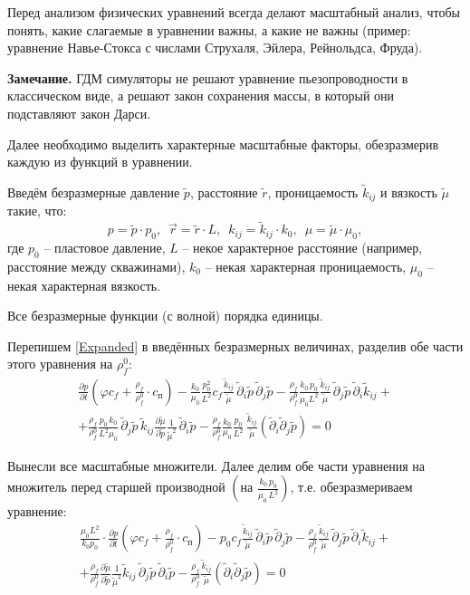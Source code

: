 \documentclass[a4paper,14pt]{extarticle}
\newcommand{\beq}{\begin{equation}}
\newcommand{\eeq}{\end{equation}}
\begin{document}
Перед анализом физических уравнений всегда делают масштабный анализ, чтобы понять, какие слагаемые в уравнении важны, а какие не важны (пример: уравнение Навье-Стокса с числами Струхаля, Эйлера, Рейнольдса, Фруда).

\textbf{Замечание.} ГДМ симуляторы не решают уравнение пьезопроводности в классическом виде, а решают закон сохранения массы, в который они подставляют закон Дарси.

Далее необходимо выделить характерные масштабные факторы, обезразмерив каждую из функций в уравнении.

Введём безразмерные давление $\tilde{p}$, расстояние $\tilde{r}$, проницаемость $\tilde{k}_{ij}$ и вязкость $\tilde{\mu}$ такие, что:
\beq
p=\tilde{p}\cdot p_0,\,\,\,\vec{r}=\tilde{r}\cdot L,\,\,\,k_{ij}=\tilde{k}_{ij}\cdot k_0,\,\,\,\mu=\tilde{\mu}\cdot\mu_0,
\eeq
где $p_0$ -- пластовое давление, $L$ -- некое характерное расстояние (например, расстояние между скважинами), $k_0$ -- некая характерная проницаемость, $\mu_0$ -- некая характерная вязкость.

Все безразмерные функции (с волной) порядка единицы.

Перепишем \eqref{Expanded} в введённых безразмерных величинах, разделив обе части этого уравнения на $\rho_f^0$:
\begin{multline}
\frac{\partial p}{\partial t}\left(\varphi c_{\!f}+\frac{\rho_{\!f}}{\rho_{\!f}^0}\cdot c_\text{п}\right)-\frac{k_0}{\mu_0}\frac{p_0^2}{L^2}c_{\!f}\frac{\tilde{k}_{ij}}{\tilde{\mu}}\,\tilde{\partial}_i\tilde{p}\,\tilde{\partial}_{\!j}\tilde{p}-\frac{\rho_{\!f}}{\rho_{\!f}^0}\frac{k_0\,p_0}{\mu_0L^2}\frac{\tilde{k}_{ij}}{\tilde{\mu}}\,\tilde{\partial}_{\!j}\tilde{p}\,\tilde{\partial}_i\tilde{k}_{ij}+\\+\frac{\rho_{\!f}}{\rho_{\!f}^0}\frac{p_0\,k_0}{L^2\mu_0}\,\tilde{\partial}_{\!j}\tilde{p}\,\tilde{k}_{ij}\frac{\partial\tilde{\mu}}{\partial\tilde{p}}\frac{1}{\tilde{\mu}^2}\,\tilde{\partial}_i\tilde{p}-\frac{\rho_{\!f}}{\rho_{\!f}^0}\frac{k_0}{\mu_0}\frac{p_0}{L^2}\,\frac{\tilde{k}_{ij}}{\tilde{\mu}}\left(\tilde{\partial}_i\tilde{\partial}_{\!j}\tilde{p}\right)=0
\end{multline}

Вынесли все масштабные множители. Далее делим обе части уравнения на множитель перед старшей производной $\left(\text{на }\frac{k_0\,p_0}{\mu_0\,L^2}\right)$, т.е. обезразмериваем уравнение:
\begin{multline}\label{PiezoEqDiv}
\frac{\mu_0L^2}{k_0p_0}\cdot\frac{\partial p}{\partial t}\left(\varphi c_{\!f}+\frac{\rho_{\!f}}{\rho_{\!f}^0}\cdot c_\text{п}\right)-p_0c_{\!f}\frac{\tilde{k}_{ij}}{\tilde{\mu}}\,\tilde{\partial}_i\tilde{p}\,\tilde{\partial}_{\!j}\tilde{p}-\frac{\rho_{\!f}}{\rho_{\!f}^0}\frac{\tilde{k}_{ij}}{\tilde{\mu}}\,\tilde{\partial}_{\!j}\tilde{p}\,\tilde{\partial}_i\tilde{k}_{ij}+\\+\frac{\rho_{\!f}}{\rho_{\!f}^0}\frac{\partial\tilde{\mu}}{\partial\tilde{p}}\frac{1}{\tilde{\mu}^2}\tilde{k}_{ij}\,\tilde{\partial}_{\!j}\tilde{p}\,\tilde{\partial}_i\tilde{p}-\frac{\rho_{\!f}}{\rho_{\!f}^0}\frac{\tilde{k}_{ij}}{\tilde{\mu}}\left(\tilde{\partial}_i\tilde{\partial}_{\!j}\tilde{p}\right)=0
\end{multline}
\end{document}
